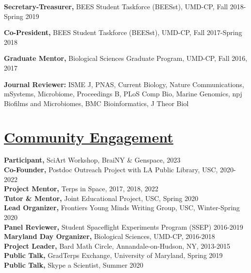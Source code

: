 \documentclass[]{res}
\begin{document}
\begin{resume}
{\bf Secretary-Treasurer,} {BEES Student Taskforce (BEESst)}, UMD-CP, Fall 2018-Spring 2019 %

{\bf Co-President,} {BEES Student Taskforce (BEESst)}, UMD-CP, Fall 2017-Spring 2018

{\bf Graduate Mentor,} {Biological Sciences Graduate Program}, UMD-CP, Fall 2016, 2017 %

{\bf Journal Reviewer:} ISME J, PNAS, Current Biology, Nature Communications, mSystems, Microbiome, Proceedings B, PLoS Comp Bio, Marine Genomics, npj Biofilms and Microbiomes, BMC Bioinformatics, J Theor Biol

\newpage

\section{\underline{Community Engagement}}\vspace{2mm}
{\bf Participant,} SciArt Workshop, BraiNY \& Genspace, 2023\\
{\bf Co-Founder,} Postdoc Outreach Project with LA Public Library, USC, 2020-2022\\
{\bf Project Mentor,} Terps in Space, 2017, 2018, 2022\\
{\bf Tutor \& Mentor,} Joint Educational Project, USC, Spring 2020\\
{\bf Lead Organizer,} Frontiers Young Minds Writing Group, USC, Winter-Spring 2020\\
{\bf Panel Reviewer,} Student Spaceflight Experiments Program (SSEP) 2016-2019\\
{\bf Maryland Day Organizer,} Biological Sciences, UMD-CP, 2016-2018\\
{\bf Project Leader,} Bard Math Circle, Annandale-on-Hudson, NY, 2013-2015 \\
{\bf Public Talk,} GradTerps Exchange, University of Maryland, Spring 2019\\
{\bf Public Talk,} Skype a Scientist, Summer 2020

  

\end{resume}
\end{document}
